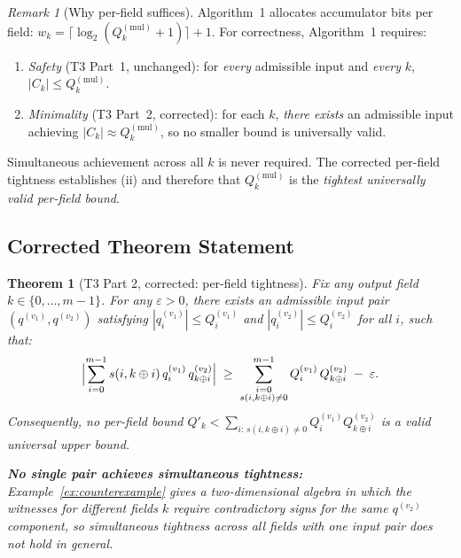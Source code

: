 \documentclass[11pt,a4paper]{article}
\theoremstyle{definition}
\theoremstyle{plain}
\newtheorem{theorem}{Theorem}[section]
\theoremstyle{remark}
\newtheorem{remark}{Remark}[section]
\newcommand{\ceil}[1]{\lceil #1 \rceil}
\begin{document}
\begin{remark}[Why per-field suffices]
\label{rem:per-field-suffices}
Algorithm~1 allocates accumulator bits per field:
$w_k = \ceil{\log_2(Q_k^{(\mathrm{mul})} + 1)} + 1$.
For correctness, Algorithm~1 requires:
\begin{enumerate}[label=(\roman*)]
  \item \emph{Safety} (T3 Part~1, unchanged): for \emph{every} admissible
        input and \emph{every} $k$, $|C_k| \le Q_k^{(\mathrm{mul})}$.
  \item \emph{Minimality} (T3 Part~2, corrected): for each $k$,
        \emph{there exists} an admissible input achieving $|C_k| \approx
        Q_k^{(\mathrm{mul})}$, so no smaller bound is universally valid.
\end{enumerate}
Simultaneous achievement across all $k$ is never required.
The corrected per-field tightness establishes (ii) and therefore
that $Q_k^{(\mathrm{mul})}$ is the \emph{tightest universally valid
per-field bound}.
\end{remark}

\subsection{Corrected Theorem Statement}
\label{sec:gap1-thm}

\begin{theorem}[T3 Part 2, corrected: per-field tightness]
\label{thm:growth-corrected}
Fix any output field $k \in \{0,\ldots,m-1\}$.
For any $\varepsilon > 0$, there exists an admissible input pair
$(q^{(v_1)}, q^{(v_2)})$ satisfying $|q_i^{(v_1)}| \le Q_i^{(v_1)}$
and $|q_i^{(v_2)}| \le Q_i^{(v_2)}$ for all $i$, such that:
\[
  \Bigl|\sum_{i=0}^{m-1} s(i,k\oplus i)\, q_i^{(v_1)}\, q_{k\oplus i}^{(v_2)}\Bigr|
  \;\ge\;
  \sum_{\substack{i=0\\s(i,k\oplus i)\ne 0}}^{m-1}
    Q_i^{(v_1)}\, Q_{k\oplus i}^{(v_2)} \;-\; \varepsilon.
\]
Consequently, no per-field bound $Q'_k < \sum_{i:\,s(i,k\oplus i)\ne 0}
Q_i^{(v_1)} Q_{k\oplus i}^{(v_2)}$ is a valid universal upper bound.

\noindent\textbf{No single pair achieves simultaneous tightness:}
Example~\ref{ex:counterexample} gives a two-dimensional algebra in which
the witnesses for different fields $k$ require contradictory signs for
the same $q^{(v_2)}$ component, so simultaneous tightness across all
fields with one input pair does not hold in general.
\end{theorem}
\end{document}
